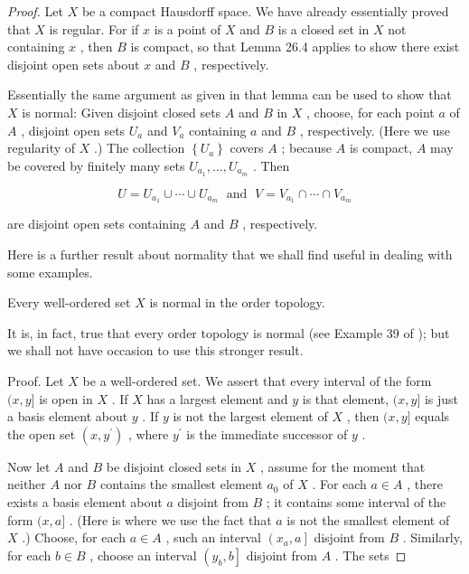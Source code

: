 \begin{proof}
Let \(X\) be a compact Hausdorff space. We have already essentially proved that \(X\) is regular. For if \(x\) is a point of \(X\) and \(B\) is a closed set in \(X\) not containing \(x\) , then \(B\) is compact, so that Lemma 26.4 applies to show there exist disjoint open sets about \(x\) and \(B\) , respectively.

Essentially the same argument as given in that lemma can be used to show that \(X\) is normal: Given disjoint closed sets \(A\) and \(B\) in \(X\) , choose, for each point \(a\) of \(A\) , disjoint open sets \({U}_{a}\) and \({V}_{a}\) containing \(a\) and \(B\) , respectively. (Here we use regularity of \(X\) .) The collection \(\left\{  {U}_{a}\right\}\) covers \(A\) ; because \(A\) is compact, \(A\) may be covered by finitely many sets \({U}_{{a}_{1}},\ldots ,{U}_{{a}_{m}}\) . Then

\[
U = {U}_{{a}_{1}} \cup  \cdots  \cup  {U}_{{a}_{m}}\;\text{ and }\;V = {V}_{{a}_{1}} \cap  \cdots  \cap  {V}_{{a}_{m}}
\]

are disjoint open sets containing \(A\) and \(B\) , respectively.

Here is a further result about normality that we shall find useful in dealing with some examples.

\begin{theorem}
	Every well-ordered set \(X\) is normal in the order topology.

It is, in fact, true that every order topology is normal (see Example 39 of \cite{SteenSeebach1970}); but we shall not have occasion to use this stronger result.

\end{theorem}
Proof. Let \(X\) be a well-ordered set. We assert that every interval of the form \((x,y\rbrack\) is open in \(X\) . If \(X\) has a largest element and \(y\) is that element, \((x,y\rbrack\) is just a basis element about \(y\) . If \(y\) is not the largest element of \(X\) , then \((x,y\rbrack\) equals the open set \(\left( {x,{y}^{\prime }}\right)\) , where \({y}^{\prime }\) is the immediate successor of \(y\) .

Now let \(A\) and \(B\) be disjoint closed sets in \(X\) , assume for the moment that neither \(A\) nor \(B\) contains the smallest element \({a}_{0}\) of \(X\) . For each \(a \in  A\) , there exists a basis element about \(a\) disjoint from \(B\) ; it contains some interval of the form \((x,a\rbrack\) . (Here is where we use the fact that \(a\) is not the smallest element of \(X\) .) Choose, for each \(a \in  A\) , such an interval \(\left( {{x}_{a},a}\right\rbrack\) disjoint from \(B\) . Similarly, for each \(b \in  B\) , choose an interval \(\left( {{y}_{b},b}\right\rbrack\) disjoint from \(A\) . The sets


\end{proof}
